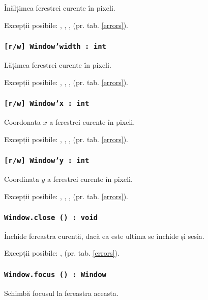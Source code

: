 Înălțimea ferestrei curente în pixeli.

Excepții posibile: , , ,  (pr. tab. \ref{errors}).

\subsubsection{\texttt{[r/w] Window'width : int}}

Lățimea ferestrei curente în pixeli.

Excepții posibile: , , ,  (pr. tab. \ref{errors}).

\subsubsection{\texttt{[r/w] Window'x : int}}

Coordonata $x$ a ferestrei curente în pixeli.

Excepții posibile: , , ,  (pr. tab. \ref{errors}).

\subsubsection{\texttt{[r/w] Window'y : int}}

Coordinata $y$ a ferestrei curente în pixeli.

Excepții posibile: , , ,  (pr. tab. \ref{errors}).

\subsubsection{\texttt{Window.close () : void}}

Închide fereastra curentă, dacă ea este ultima se închide și sesia.

Excepții posibile: ,  (pr. tab. \ref{errors}).

\subsubsection{\texttt{Window.focus () : Window}}

Schimbă focusul la fereastra aceasta.

